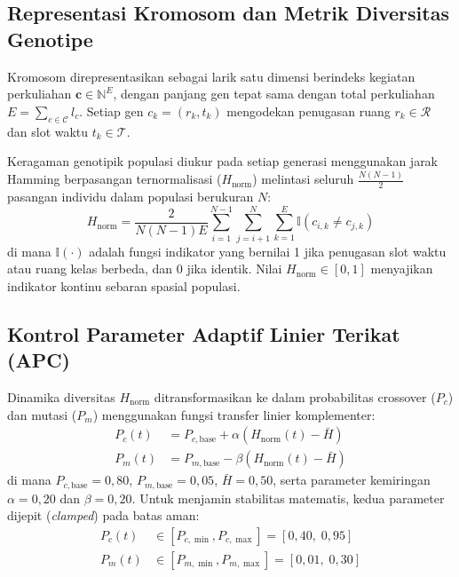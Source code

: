 \documentclass[journal]{IEEEtran}
\begin{document}
\subsection{Representasi Kromosom dan Metrik Diversitas Genotipe}
Kromosom direpresentasikan sebagai larik satu dimensi berindeks kegiatan perkuliahan $\mathbf{c} \in \mathbb{N}^E$, dengan panjang gen tepat sama dengan total perkuliahan $E = \sum_{c \in \mathcal{C}} l_c$. Setiap gen $c_k = (r_k, t_k)$ mengodekan penugasan ruang $r_k \in \mathcal{R}$ dan slot waktu $t_k \in \mathcal{T}$.

Keragaman genotipik populasi diukur pada setiap generasi menggunakan jarak Hamming berpasangan ternormalisasi ($H_{\text{norm}}$) melintasi seluruh $\frac{N(N-1)}{2}$ pasangan individu dalam populasi berukuran $N$:
\begin{equation}
H_{\text{norm}} = \frac{2}{N(N-1)E} \sum_{i=1}^{N-1} \sum_{j=i+1}^N \sum_{k=1}^E \mathbb{I}(c_{i,k} \neq c_{j,k})
\end{equation}
di mana $\mathbb{I}(\cdot)$ adalah fungsi indikator yang bernilai 1 jika penugasan slot waktu atau ruang kelas berbeda, dan 0 jika identik. Nilai $H_{\text{norm}} \in [0, 1]$ menyajikan indikator kontinu sebaran spasial populasi.

\subsection{Kontrol Parameter Adaptif Linier Terikat (APC)}
Dinamika diversitas $H_{\text{norm}}$ ditransformasikan ke dalam probabilitas crossover ($P_c$) dan mutasi ($P_m$) menggunakan fungsi transfer linier komplementer:
\begin{align}
P_c(t) &= P_{c,\text{base}} + \alpha \left( H_{\text{norm}}(t) - \bar{H} \right) \\
P_m(t) &= P_{m,\text{base}} - \beta \left( H_{\text{norm}}(t) - \bar{H} \right)
\end{align}
di mana $P_{c,\text{base}} = 0{,}80$, $P_{m,\text{base}} = 0{,}05$, $\bar{H} = 0{,}50$, serta parameter kemiringan $\alpha = 0{,}20$ dan $\beta = 0{,}20$. Untuk menjamin stabilitas matematis, kedua parameter dijepit (\textit{clamped}) pada batas aman:
\begin{align}
P_c(t) &\in [P_{c,\min}, P_{c,\max}] = [0{,}40, \; 0{,}95] \\
P_m(t) &\in [P_{m,\min}, P_{m,\max}] = [0{,}01, \; 0{,}30]
\end{align}
\end{document}
